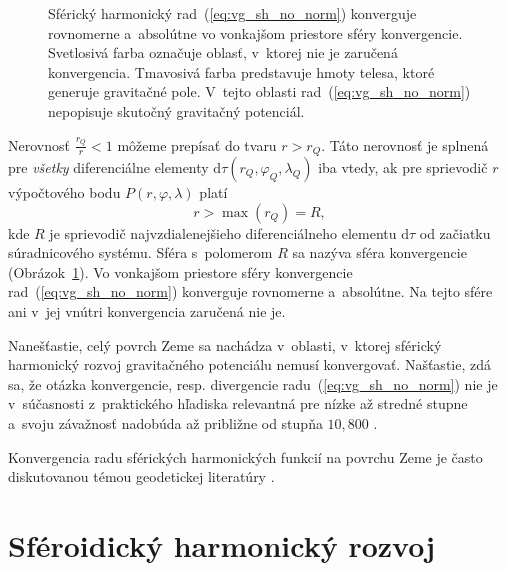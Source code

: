 \documentclass[a4paper,12pt]{book}
\newcommand{\diff}{\mathrm d}
\begin{document}
\begin{figure}
\centering

\caption{Sférický harmonický rad~(\ref{eq:vg_sh_no_norm}) konverguje rovnomerne 
a~absolútne vo vonkajšom priestore sféry konvergencie.  Svetlosivá farba 
označuje oblasť, v~ktorej nie je zaručená konvergencia.  Tmavosivá farba 
predstavuje hmoty telesa, ktoré generuje gravitačné pole.  V~tejto oblasti 
rad~(\ref{eq:vg_sh_no_norm}) nepopisuje skutočný gravitačný potenciál.}
\label{fig:spherical_harmonics_convergence}
\end{figure}

Nerovnosť $\frac{r_Q}{r} < 1$ môžeme prepísať do tvaru $r > r_Q$.  Táto
nerovnosť je splnená pre \emph{všetky} diferenciálne elementy $\diff \tau(r_Q,
\varphi_Q, \lambda_Q)$ iba vtedy, ak pre sprievodič $r$ výpočtového bodu $P(r,
\varphi, \lambda)$ platí
%
\begin{equation}
\label{eq:spherical_harmonic_convergence}
r > \max(r_Q) = R{,}
\end{equation}
%
kde $R$ je sprievodič najvzdialenejšieho diferenciálneho elementu $\diff\tau$ 
od začiatku súradnicového systému.  Sféra s~polomerom $R$ sa nazýva sféra 
konvergencie \parencite{Hotine} 
(Obrázok~\ref{fig:spherical_harmonics_convergence}).  Vo vonkajšom priestore 
sféry konvergencie rad~(\ref{eq:vg_sh_no_norm}) konverguje rovnomerne 
a~absolútne.  Na tejto sfére ani v~jej vnútri konvergencia zaručená nie je.

Nanešťastie, celý povrch Zeme sa nachádza v~oblasti, v~ktorej sférický 
harmonický rozvoj gravitačného potenciálu nemusí konvergovať.  Našťastie, zdá 
sa, že otázka konvergencie, resp. divergencie radu~(\ref{eq:vg_sh_no_norm}) nie 
je v~súčasnosti z~praktického hľadiska relevantná pre nízke až stredné stupne 
a~svoju závažnosť nadobúda až približne od stupňa $10{,}800$ 
\parencite{Hirt2016,Rexer2017}.

Konvergencia radu sférických harmonických funkcií na povrchu Zeme je často 
diskutovanou témou geodetickej literatúry 
\parencite{Hotine,Krarup1969,MoritzAdvancedGeodesy,Sjoberg1980,Jekeli1983,SansoGeoidDetermination}.







\chapter{Sféroidický harmonický rozvoj}
\label{sec:spheroidal_harmonics_chapter}
\end{document}

